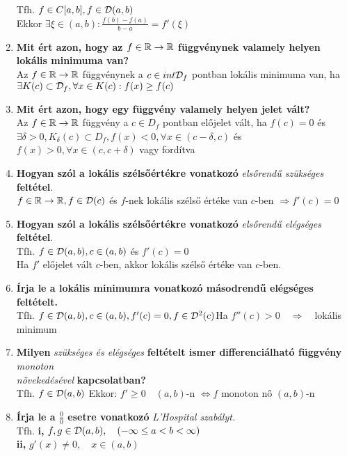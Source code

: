 \documentclass[a4paper,11pt]{article}
\begin{document}
\begin{enumerate}
	Tfh. $f\in C[a,b],f\in\mathcal{D}(a,b)$\\[0.2cm]Ekkor $\exists\xi\in(a,b):\frac{f(b)-f(a)}{b-a}= f'(\xi)$
	\item \textbf{Mit ért azon, hogy az $f\in\displaystyle\mathbb{R}\to\mathbb{R}$ függvénynek valamely helyen lokális minimuma van?}\\[0.1cm]Az $f\in\displaystyle\mathbb{R}\to\mathbb{R}$ függvénynek a $c\in int\mathcal{D}_f$ pontban lokális minimuma van, ha\\[0.1cm]$\exists K(c)\subset\mathcal{D}_f,\forall x\in K(c): f(x)\geq f(c)$
	\item \textbf{Mit ért azon, hogy egy függvény valamely helyen jelet vált?}\\[0.1cm]
	Az $f\in\displaystyle\mathbb{R}\to\mathbb{R}$ függvény a $c\in D_f$ pontban előjelet vált, ha $f(c)=0$ és\\[0.1cm]
	$\exists\delta>0,K_{\delta}(c)\subset D_f,f(x)<0,\forall x\in(c-\delta,c)$ és
	$f(x)>0,\forall x\in(c,c+\delta)$ vagy fordítva
	\newpage\item \textbf{Hogyan szól a lokális szélsőértékre vonatkozó} 
	\textit{elsőrendű szükséges} \textbf{feltétel}.\\[0.1cm]$f\in\displaystyle\mathbb{R}\to\mathbb{R},f\in\mathcal{D}(c)$ és
	$f$-nek lokális szélső értéke van $c$-ben $\Rightarrow f'(c)=0$
	\item \textbf{Hogyan szól a lokális szélsőértékre vonatkozó} 
	\textit{elsőrendű elégséges} \textbf{feltétel}.\\[0.1cm]Tfh. 
	$f\in\mathcal{D}(a,b),c\in(a,b)$ és $f'(c)=0$\\[0.1cm]Ha $f'$ előjelet vált $c$-ben, akkor 
	lokális szélső értéke van $c$-ben.
	\item\textbf{Írja le a lokális minimumra vonatkozó másodrendű elégséges feltételt.}
	\\[0.1cm]Tfh. $f\in\mathcal{D}(a,b),c\in(a,b),f'(c)=0,f\in\mathcal{D}^2(c)\\[0.2cm]$Ha 
	$f''(c)>0\quad\Rightarrow\quad$lokális minimum
	\item\textbf{Milyen} \textit{szükséges és elégséges} \textbf{feltételt ismer
	differenciálható függvény} \textit{monoton \\ növekedésével} \textbf{
	kapcsolatban?}\\[0.1cm]Tfh. $f\in\mathcal{D}(a,b)$ Ekkor: $f'\geq0\quad(a,b)$-n $\Leftrightarrow f$ monoton nő $(a,b)$-n
	\item \textbf{Írja le a $\frac{0}{0}$ esetre vonatkozó}
	\textit{L'Hospital szabályt.}\\[0.1cm]
	Tfh. \textbf{i,} $f,g\in\mathcal{D}(a,b),\quad(-\infty\leq a<b<\infty)$
	\\[0.2cm]\hspace*{0.7cm} \textbf{ii,} $g'(x)\neq0,\quad x\in(a,b)$

\end{enumerate}
\end{document}
